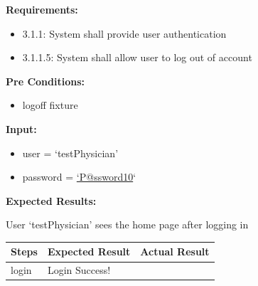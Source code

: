 \documentclass[letterpaper,10pt,english]{sphinxmanual}
\begin{document}
\begin{fulllineitems}
\label{STD/test_login:test_login.test_login_physician}
\textbf{Requirements:}
\begin{itemize}
\item {} 
3.1.1: System shall provide user authentication

\item {} 
3.1.1.5: System shall allow user to log out of account

\end{itemize}

\textbf{Pre Conditions:}
\begin{itemize}
\item {} 
logoff fixture

\end{itemize}

\textbf{Input:}
\begin{itemize}
\item {} 
user = `testPhysician'

\item {} 
password = \href{mailto:'P@ssword10}{`P@ssword10}`

\end{itemize}

\textbf{Expected Results:}

User `testPhysician' sees the home page after logging in

\begin{tabulary}{\linewidth}{|L|L|L|}
\hline
\textsf{\relax 
Steps
} & \textsf{\relax 
Expected Result
} & \textsf{\relax 
Actual Result
}\\
\hline
login
 & 
Login Success!
 & \\
\hline\end{tabulary}


\end{fulllineitems}

\end{document}
